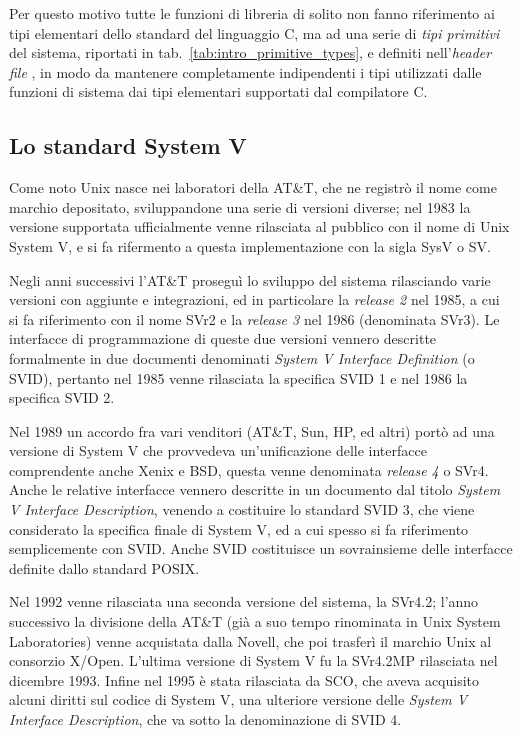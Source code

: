Per questo motivo tutte le funzioni di libreria di solito non fanno
riferimento ai tipi elementari dello standard del linguaggio C, ma ad una
serie di  \textsl{tipi primitivi} del sistema, riportati
in tab.~\ref{tab:intro_primitive_types}, e definiti nell'\textit{header file}
, in modo da mantenere completamente indipendenti i tipi
utilizzati dalle funzioni di sistema dai tipi elementari supportati dal
compilatore C.


\subsection{Lo standard System V}
\label{sec:intro_sysv}

Come noto Unix nasce nei laboratori della AT\&T, che ne registrò il nome come
marchio depositato, sviluppandone una serie di versioni diverse; nel 1983 la
versione supportata ufficialmente venne rilasciata al pubblico con il nome di
Unix System V, e si fa rifermento a questa implementazione con la sigla SysV o
SV.

Negli anni successivi l'AT\&T proseguì lo sviluppo del sistema rilasciando
varie versioni con aggiunte e integrazioni, ed in particolare la
\textit{release 2} nel 1985, a cui si fa riferimento con il nome SVr2 e la
\textit{release 3} nel 1986 (denominata SVr3). Le interfacce di programmazione
di queste due versioni vennero descritte formalmente in due documenti
denominati  \textit{System V
  Interface Definition} (o SVID), pertanto nel 1985 venne rilasciata la
specifica SVID 1 e nel 1986 la specifica SVID 2.

Nel 1989 un accordo fra vari venditori (AT\&T, Sun, HP, ed altri) portò ad una
versione di System V che provvedeva un'unificazione delle interfacce
comprendente anche Xenix e BSD, questa venne denominata \textit{release 4} o
SVr4. Anche le relative interfacce vennero descritte in un documento dal
titolo \textit{System V Interface Description}, venendo a costituire lo
standard SVID 3, che viene considerato la specifica finale di System V, ed a
cui spesso si fa riferimento semplicemente con SVID. Anche SVID costituisce un
sovrainsieme delle interfacce definite dallo standard POSIX.  

Nel 1992 venne rilasciata una seconda versione del sistema, la SVr4.2; l'anno
successivo la divisione della AT\&T (già a suo tempo rinominata in Unix System
Laboratories) venne acquistata dalla Novell, che poi trasferì il marchio Unix
al consorzio X/Open. L'ultima versione di System V fu la SVr4.2MP rilasciata
nel dicembre 1993. Infine nel 1995 è stata rilasciata da SCO, che aveva
acquisito alcuni diritti sul codice di System V, una ulteriore versione delle
\textit{System V Interface Description}, che va sotto la denominazione di SVID
4.

